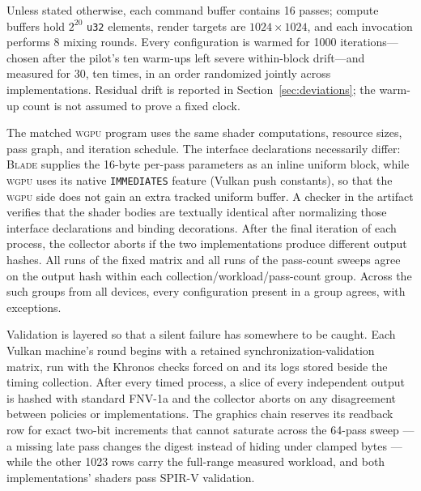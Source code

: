 \documentclass[10pt,twocolumn]{article}
\newcommand{\blade}{\textsc{Blade}}
\newcommand{\wgpu}{\textsc{wgpu}}
\begin{document}
Unless stated otherwise, each command buffer contains 16 passes; compute
buffers hold $2^{20}$ \texttt{u32} elements, render targets are
$1024\times1024$, and each invocation performs 8 mixing rounds. Every
configuration is warmed for 1000 iterations---chosen after the pilot's ten
warm-ups left severe within-block drift---and measured for 30, ten times, in
an order randomized jointly across implementations. Residual drift is reported
in Section~\ref{sec:deviations}; the warm-up count is not assumed to prove a
fixed clock.

The matched \wgpu{} program uses the same shader computations, resource sizes,
pass graph, and iteration schedule. The interface declarations necessarily
differ: \blade{} supplies the 16-byte per-pass parameters as an inline uniform
block, while \wgpu{} uses its native \texttt{IMMEDIATES} feature (Vulkan push
constants), so that the \wgpu{} side does not gain an extra tracked uniform
buffer. A checker in the artifact verifies that the shader bodies are textually
identical after normalizing those interface declarations and binding
decorations. After the final iteration of each process, the collector aborts
if the two implementations produce different output hashes. All
 runs of the fixed matrix
and all  runs of the pass-count sweeps agree on the output hash
within each collection/workload/pass-count group. Across the
 such groups from all devices, every configuration
present in a group agrees, with  exceptions.

Validation is layered so that a silent failure has somewhere to be caught.
Each Vulkan machine's round begins with a retained synchronization-validation
matrix, run with the Khronos checks forced on and its logs stored beside the
timing collection. After every timed process, a slice of every independent
output is hashed with standard FNV-1a and the collector aborts on any
disagreement between policies or implementations. The graphics chain reserves
its readback row for exact two-bit increments that cannot saturate across the
64-pass sweep --- a missing late pass changes the digest instead of hiding
under clamped bytes --- while the other 1023 rows carry the full-range
measured workload, and both implementations' shaders pass SPIR-V validation.
\end{document}
